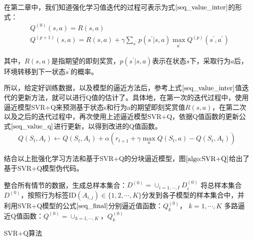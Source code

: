 在第二章中，我们知道强化学习值迭代的过程可表示为式$\eqref{seq_value_inter}$的形式：
\begin{equation}\label{seq_value_inter}
\begin{aligned}
&Q^{(0)}(s,a) = R(s,a) \\
&Q^{(p+1)}(s,a) = R(s,a) + \gamma \sum_{s^{'}} p(s^{'}|s,a) \max_{a^{'}} Q^{(p)}(s^{'},a^{'})
\end{aligned}
\end{equation}

其中，$R(s,a)$是指期望的即刻奖赏，$p(s^{'}|s,a)$表示在状态$s$下，采取行为$a$后，环境转移到下一状态$s^{'}$的概率。

所以，给定好训练数据，以及模型的逼近方法后，参考上式$\eqref{seq_value_inter}$值迭代的更新方法，就可以进行Q值的估计了。具体地，在第一次的迭代过程中，使用逼近模型SVR+Q来预测基于状态s和行为a的期望即刻奖赏值$R(s,a)$，在第二次以及之后的迭代过程中，再次使用上述逼近模型SVR+Q，依据Q值函数的更新公式$\eqref{seq_value_q}$进行更新，以得到改进的Q值函数。
\begin{equation}\label{seq_value_q}
\begin{aligned}
Q(S_{t}, A_{t}) \gets Q(S_{t}, A_{t}) + \alpha (r_{t+1} + \gamma \max_{a} Q(S_{t}, a) - Q(S_{t}, A_{t}))
\end{aligned}
\end{equation}

结合以上批强化学习方法和基于SVR+Q的分块逼近模型，图$\ref{algo:SVR+Q}$给出了基于SVR+Q模型伪代码。

\begin{algorithm}[htbp]
\small
\SetAlgoLined
{} 

整合所有情节的数据，生成总样本集合：$D^{(0)}=\cup_{i=1,\cdots,I} D_{i}^{(0)}$\;
将总样本集合$D^{(0)}$，按照行为标签ID$(A_{i,j}) \in \{1,2,\cdots, K \}$分发到各子模型的样本集合中，并利用SVR+Q模型的公式$\eqref{seq_final}$分别逼近值函数：$Q_{k}^{(0)}$， $k=1,\cdots,K$\;
多路逼近Q值函数：$Q^{(0)}=\cup_{k=1,\cdots,K}，Q_{k}^{(0)}$\;
\caption{SVR+Q算法}
\label{algo:SVR+Q}
\end{algorithm}

